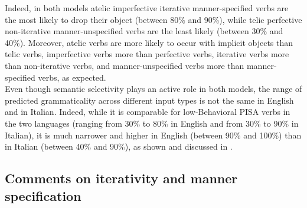 Indeed, in both models atelic imperfective iterative manner-specified verbs are the most likely to drop their object (between 80\% and 90\%), while telic perfective non-iterative manner-unspecified verbs are the least likely (between 30\% and 40\%). Moreover, atelic verbs are more likely to occur with implicit objects than telic verbs, imperfective verbs more than perfective verbs, iterative verbs more than non-iterative verbs, and manner-unspecified verbs more than manner-specified verbs, as expected.\\
Even though semantic selectivity plays an active role in both models, the range of predicted grammaticality across different input types is not the same in English and in Italian. Indeed, while it is comparable for low-Behavioral PISA verbs in the two languages (ranging from 30\% to 80\% in English and from 30\% to 90\% in Italian), it is much narrower and higher in English (between 90\% and 100\%) than in Italian (between 40\% and 90\%), as shown and discussed in .


\subsection{Comments on iterativity and manner specification}


